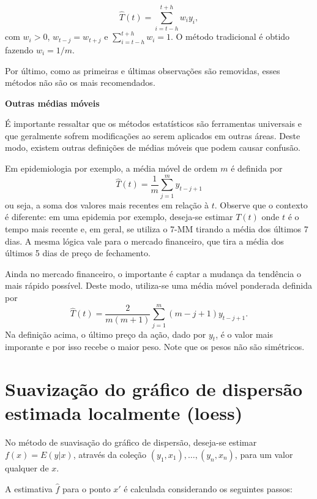 \documentclass[
  letterpaper,
  DIV=11,
  numbers=noendperiod]{scrartcl}
\theoremstyle{definition}
\theoremstyle{definition}
\theoremstyle{plain}
\theoremstyle{plain}
\theoremstyle{remark}
\begin{document}
\[\hat{T}(t)=\sum_{i=t-h}^{t+h} w_i y_{i},\] com \(w_i>0\),
\(w_{t-j}=w_{t+j}\) e \(\sum_{i=t-h}^{t+h}w_i=1\). O método tradicional
é obtido fazendo \(w_i=1/m\).

Por último, como as primeiras e últimas observações são removidas, esses
métodos não são os mais recomendados.

\textbf{Outras médias móveis}

É importante ressaltar que os métodos estatísticos são ferramentas
universais e que geralmente sofrem modificações ao serem aplicados em
outras áreas. Deste modo, existem outras definições de médias móveis que
podem causar confusão.

Em epidemiologia por exemplo, a média móvel de ordem \(m\) é definida
por \[\hat{T}(t)=\frac{1}{m}\sum_{j=1}^m y_{t-j+1}\] ou seja, a soma dos
valores mais recentes em relação à \(t\). Observe que o contexto é
diferente: em uma epidemia por exemplo, deseja-se estimar \(T(t)\) onde
\(t\) é o tempo mais recente e, em geral, se utiliza o 7-MM tirando a
média dos últimos 7 dias. A mesma lógica vale para o mercado financeiro,
que tira a média dos últimos 5 dias de preço de fechamento.

Ainda no mercado financeiro, o importante é captar a mudança da
tendência o mais rápido possível. Deste modo, utiliza-se uma média móvel
ponderada definida por
\[\hat{T}(t)=\frac{2}{m(m+1)}\sum_{j=1}^m(m-j+1)y_{t-j+1}.\] Na
definição acima, o último preço da ação, dado por \(y_t\), é o valor
mais imporante e por isso recebe o maior peso. Note que os pesos não são
simétricos.

\section{Suavização do gráfico de dispersão estimada localmente
(loess)}\label{suavizauxe7uxe3o-do-gruxe1fico-de-dispersuxe3o-estimada-localmente-loess}

No método de suavisação do gráfico de dispersão, deseja-se estimar
\(f(x)=E(y|x)\), através da coleção \((y_1,x_1),\ldots,(y_n,x_n)\), para
um valor qualquer de \(x\).

A estimativa \(\hat{f}\) para o ponto \(x'\) é calculada considerando os
seguintes passos:
\end{document}
